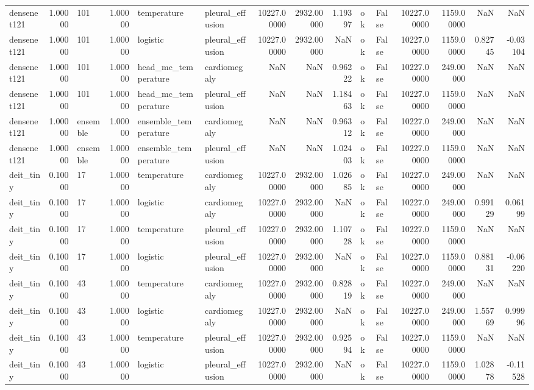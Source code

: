 \begin{tabular}{lrlrllrrrllrrrr}
densenet121 & 1.00000 & 101 & 1.00000 & temperature & pleural\_effusion & 10227.00000 & 2932.00000 & 1.19397 & ok & False & 10227.00000 & 1159.00000 & NaN & NaN \\
densenet121 & 1.00000 & 101 & 1.00000 & logistic & pleural\_effusion & 10227.00000 & 2932.00000 & NaN & ok & False & 10227.00000 & 1159.00000 & 0.82745 & -0.03104 \\
densenet121 & 1.00000 & 101 & 1.00000 & head\_mc\_temperature & cardiomegaly & NaN & NaN & 0.96222 & ok & False & 10227.00000 & 249.00000 & NaN & NaN \\
densenet121 & 1.00000 & 101 & 1.00000 & head\_mc\_temperature & pleural\_effusion & NaN & NaN & 1.18463 & ok & False & 10227.00000 & 1159.00000 & NaN & NaN \\
densenet121 & 1.00000 & ensemble & 1.00000 & ensemble\_temperature & cardiomegaly & NaN & NaN & 0.96312 & ok & False & 10227.00000 & 249.00000 & NaN & NaN \\
densenet121 & 1.00000 & ensemble & 1.00000 & ensemble\_temperature & pleural\_effusion & NaN & NaN & 1.02403 & ok & False & 10227.00000 & 1159.00000 & NaN & NaN \\
deit\_tiny & 0.10000 & 17 & 1.00000 & temperature & cardiomegaly & 10227.00000 & 2932.00000 & 1.02685 & ok & False & 10227.00000 & 249.00000 & NaN & NaN \\
deit\_tiny & 0.10000 & 17 & 1.00000 & logistic & cardiomegaly & 10227.00000 & 2932.00000 & NaN & ok & False & 10227.00000 & 249.00000 & 0.99129 & 0.06199 \\
deit\_tiny & 0.10000 & 17 & 1.00000 & temperature & pleural\_effusion & 10227.00000 & 2932.00000 & 1.10728 & ok & False & 10227.00000 & 1159.00000 & NaN & NaN \\
deit\_tiny & 0.10000 & 17 & 1.00000 & logistic & pleural\_effusion & 10227.00000 & 2932.00000 & NaN & ok & False & 10227.00000 & 1159.00000 & 0.88131 & -0.06220 \\
deit\_tiny & 0.10000 & 43 & 1.00000 & temperature & cardiomegaly & 10227.00000 & 2932.00000 & 0.82819 & ok & False & 10227.00000 & 249.00000 & NaN & NaN \\
deit\_tiny & 0.10000 & 43 & 1.00000 & logistic & cardiomegaly & 10227.00000 & 2932.00000 & NaN & ok & False & 10227.00000 & 249.00000 & 1.55769 & 0.99996 \\
deit\_tiny & 0.10000 & 43 & 1.00000 & temperature & pleural\_effusion & 10227.00000 & 2932.00000 & 0.92594 & ok & False & 10227.00000 & 1159.00000 & NaN & NaN \\
deit\_tiny & 0.10000 & 43 & 1.00000 & logistic & pleural\_effusion & 10227.00000 & 2932.00000 & NaN & ok & False & 10227.00000 & 1159.00000 & 1.02878 & -0.11528 \\

\end{tabular}
